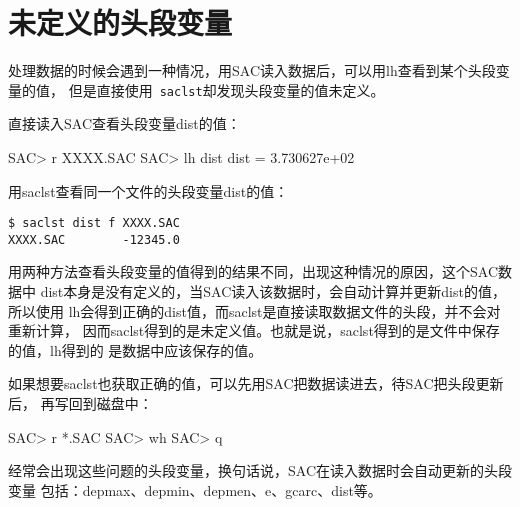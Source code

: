 \section{未定义的头段变量}
处理数据的时候会遇到一种情况，用SAC读入数据后，可以用lh查看到某个头段变量的值，
但是直接使用~\verb+saclst+却发现头段变量的值未定义。

直接读入SAC查看头段变量dist的值：
\begin{SACCode}
SAC> r XXXX.SAC
SAC> lh dist
     dist = 3.730627e+02
\end{SACCode}

用saclst查看同一个文件的头段变量dist的值：
\begin{verbatim}
$ saclst dist f XXXX.SAC
XXXX.SAC        -12345.0
\end{verbatim}

用两种方法查看头段变量的值得到的结果不同，出现这种情况的原因，这个SAC数据中
dist本身是没有定义的，当SAC读入该数据时，会自动计算并更新dist的值，所以使用
lh会得到正确的dist值，而saclst是直接读取数据文件的头段，并不会对重新计算，
因而saclst得到的是未定义值。也就是说，saclst得到的是文件中保存的值，lh得到的
是数据中应该保存的值。

如果想要saclst也获取正确的值，可以先用SAC把数据读进去，待SAC把头段更新后，
再写回到磁盘中：
\begin{SACCode}
SAC> r *.SAC
SAC> wh
SAC> q
\end{SACCode}

经常会出现这些问题的头段变量，换句话说，SAC在读入数据时会自动更新的头段变量
包括：depmax、depmin、depmen、e、gcarc、dist等。

